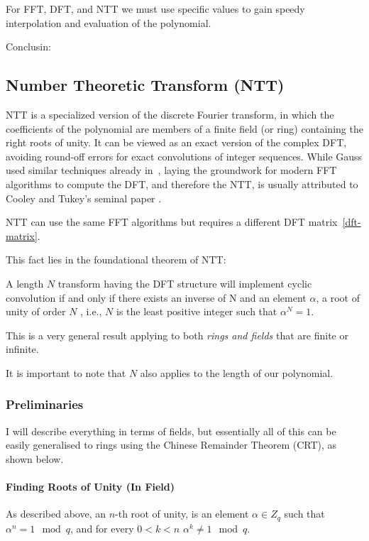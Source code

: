  \begin{corollary}
  For FFT, DFT, and NTT we must use specific values to gain speedy interpolation and
  evaluation of the polynomial. 
 \end{corollary}{Conclusin:}
 
\subsection{Number Theoretic Transform (NTT)}\label{ntt}

NTT is a specialized version of the discrete Fourier transform,
in which the coefficients of the polynomial are members of a finite field (or ring)
 containing the right roots of unity.
It can be viewed as an exact version of the complex DFT, avoiding 
round-off errors for exact convolutions of integer sequences.
While Gauss used similar techniques already in~\cite{gaussfft}, laying the groundwork 
for modern FFT algorithms to compute the DFT, and therefore the NTT, 
is usually attributed to Cooley and Tukey's seminal paper \cite{fft}.

NTT can use the same FFT algorithms but requires a 
different DFT matrix~\ref{dft-matrix}.

This fact lies in the foundational theorem of NTT:
\begin{thm}
  A length $N$ transform having the DFT structure will
  implement cyclic convolution if and only if there exists an 
  inverse of N and an element $\alpha$,
  a root of unity of order $N$ , i.e., $N$ is the least 
  positive integer such that $\alpha^N =1$.
\end{thm}
This is a very general result applying to both \emph{rings and fields} that are
finite or infinite.

It is important to note that $N$ also applies to the length of our polynomial.

\subsubsection{Preliminaries}
I will describe everything in terms of fields, but essentially all of this can be easily generalised to rings 
using the Chinese Remainder Theorem (CRT), as shown below.
\paragraph{\bf Finding Roots of Unity (In Field)}
As described above, an $n$-th root of unity, is an element $\alpha\in Z_q$ 
such that $\alpha^n =1  \mod q $, and for every $0<k<n$ $\alpha^k \neq 1 \mod q$.

